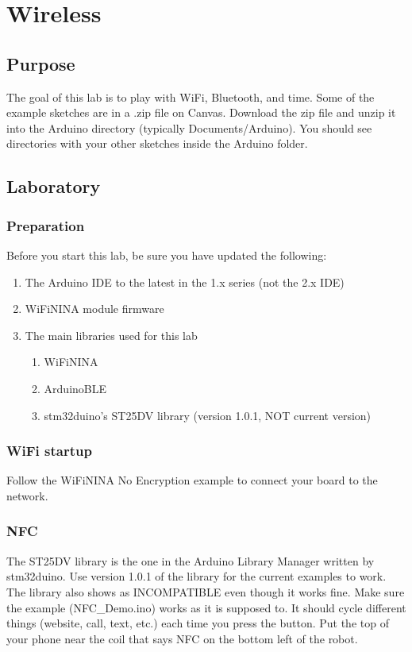 \chapter{Wireless}

\section{Purpose}
The goal of this lab is to play with WiFi, Bluetooth, and time. Some of the example
sketches are in a .zip file on Canvas. Download the zip file and unzip it into the 
Arduino directory (typically Documents/Arduino). You should see directories with 
your other sketches inside the Arduino folder.

\section{Laboratory}
\subsection{Preparation}
Before you start this lab, be sure you have updated the following:
\begin{enumerate}
    \item The Arduino IDE to the latest in the 1.x series (not the 2.x IDE)
    \item WiFiNINA module firmware
    \item The main libraries used for this lab 
    \begin{enumerate}
        \item WiFiNINA
        \item ArduinoBLE
        \item stm32duino's ST25DV library (version 1.0.1, NOT current version)
    \end{enumerate}
\end{enumerate}

\subsection{WiFi startup}
Follow the WiFiNINA No Encryption example to connect your board to the network.

\subsection{NFC}
The ST25DV library is the one in the Arduino Library Manager written by stm32duino.
Use version 1.0.1 of the library for the current examples to work. The library also 
shows as INCOMPATIBLE even though it works fine. Make sure the example (NFC\_Demo.ino) 
works as it is supposed to. It should cycle 
different things (website, call, text, etc.) each time you press the button. Put 
the top of your phone near the coil that says NFC on the bottom left of the robot.

